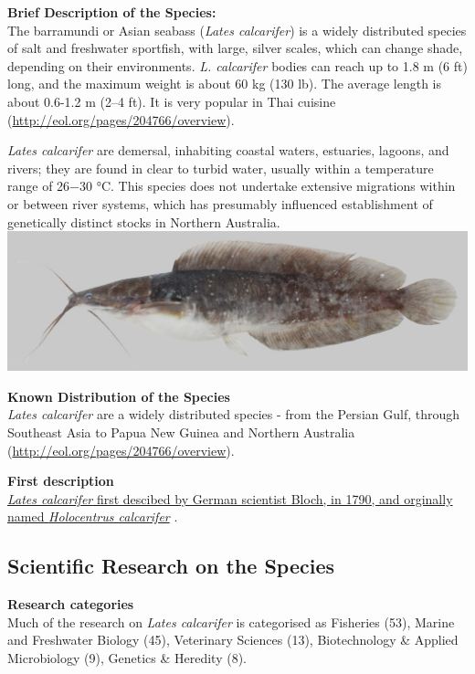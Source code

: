 \documentclass[]{book}
\theoremstyle{definition}
\theoremstyle{definition}
\theoremstyle{definition}
\theoremstyle{remark}
\begin{document}
\textbf{Brief Description of the Species:}\\
The barramundi or Asian seabass (\emph{Lates calcarifer}) is a widely
distributed species of salt and freshwater sportfish, with large, silver
scales, which can change shade, depending on their environments.
\emph{L. calcarifer} bodies can reach up to 1.8 m (6 ft) long, and the
maximum weight is about 60 kg (130 lb). The average length is about
0.6-1.2 m (2--4 ft). It is very popular in Thai cuisine
(\url{http://eol.org/pages/204766/overview}).

\emph{Lates calcarifer} are demersal, inhabiting coastal waters,
estuaries, lagoons, and rivers; they are found in clear to turbid water,
usually within a temperature range of 26−30 °C. This species does not
undertake extensive migrations within or between river systems, which
has presumably influenced establishment of genetically distinct stocks
in Northern Australia.
\includegraphics{images_species/152_Clarias_macrocephalus_CTU-P00116.jpg}

\textbf{Known Distribution of the Species}\\
\emph{Lates calcarifer} are a widely distributed species - from the
Persian Gulf, through Southeast Asia to Papua New Guinea and Northern
Australia (\url{http://eol.org/pages/204766/overview}).

\textbf{First description}\\
\href{https://www.gbif.org/species/2393172}{\emph{Lates calcarifer}
first descibed by German scientist Bloch, in 1790, and orginally named
\emph{Holocentrus calcarifer}} .

\hypertarget{scientific-research-on-the-species}{%
\subsection{Scientific Research on the
Species}\label{scientific-research-on-the-species}}

\textbf{Research categories}\\
Much of the research on \emph{Lates calcarifer} is categorised as
Fisheries (53), Marine and Freshwater Biology (45), Veterinary Sciences
(13), Biotechnology \& Applied Microbiology (9), Genetics \& Heredity
(8).
\end{document}
